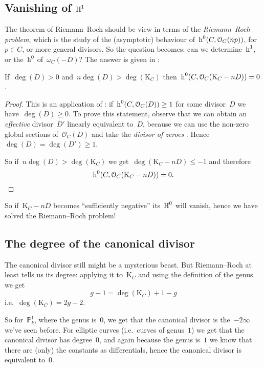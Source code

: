 \documentclass[10pt,a4paper]{article}
\begin{document}
\subsection{Vanishing of \texorpdfstring{$\operatorname{H}^1$}{first cohomology groups}}
The theorem of Riemann--Roch should be view in terms of the \emph{Riemann--Roch problem}, which is the study of the (asymptotic) behaviour of~$\operatorname{h}^0(C,\mathcal{O}_C(np))$, for~$p\in C$, or more general divisors. So the question becomes: can we determine~$\operatorname{h}^1$, or the~$\operatorname{h}^0$ of~$\omega_C(-D)$? The answer is given in \cite[remark IV.1.3.2]{hartshorne-algebraic-geometry}:
\begin{lemma}
  If~$\deg(D)>0$ and~$n\deg(D)>\deg(\mathrm{K}_C)$ then~$\operatorname{h}^0(C,\mathcal{O}_C(\mathrm{K}_C-nD))=0$.

  \begin{proof}
    This is an application of \cite[lemma IV.1.2]{hartshorne-algebraic-geometry}: if~$\operatorname{h}^0(C,\mathcal{O}_C(D))\geq 1$ for some divisor~$D$ we have~$\deg(D)\geq 0$. To prove this statement, observe that we can obtain an \emph{effective} divisor~$D'$ linearly equivalent to~$D$, because we can use the non-zero global sections of~$\mathcal{O}_C(D)$ and take the \emph{divisor of zeroes} \cite[proposition II.7.7]{hartshorne-algebraic-geometry}. Hence~$\deg(D)=\deg(D')\geq 1$.

    So if~$n\deg(D)>\deg(\mathrm{K}_C)$ we get~$\deg(\mathrm{K}_C-nD)\leq -1$ and therefore
    \begin{equation}
      \operatorname{h}^0(C,\mathcal{O}_C(\mathrm{K}_C-nD))=0.
    \end{equation}
  \end{proof}
\end{lemma}
So if~$\mathrm{K}_C-nD$ becomes ``sufficiently negative'' its~$\operatorname{H}^0$ will vanish, hence we have solved the Riemann--Roch problem!

\subsection{The degree of the canonical divisor}
The canonical divisor still might be a mysterious beast. But Riemann--Roch at least tells us its degree: applying it to~$\mathrm{K}_C$ and using the definition of the genus we get
\begin{equation}
  g-1=\deg(\mathrm{K}_C)+1-g
\end{equation}
i.e.\ $\deg(\mathrm{K}_C)=2g-2$.

So for~$\mathbb{P}_k^1$, where the genus is~$0$, we get that the canonical divisor is the~$-2\infty$ we've seen before. For elliptic curves (i.e.\ curves of genus~$1$) we get that the canonical divisor has degree~$0$, and again because the genus is~$1$ we know that there are (only) the constants as differentials, hence the canonical divisor is equivalent to~$0$.
\end{document}
